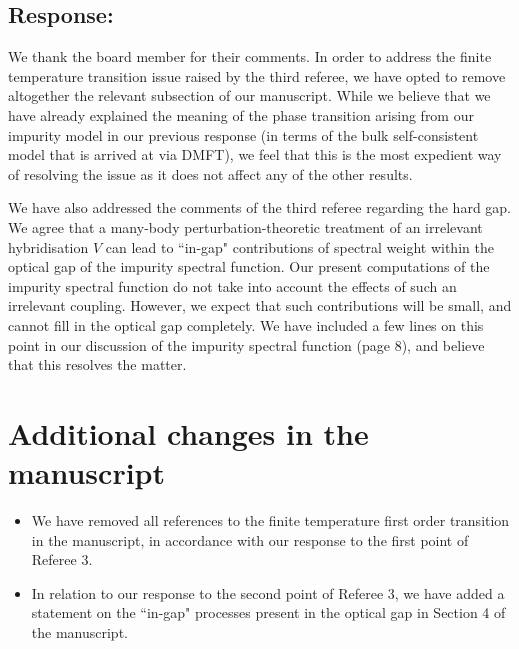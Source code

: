 \documentclass{article}
\newcommand{\response}[1]{{\color{blue}\subsection*{Response:}{#1}\vspace*{10pt}}}
\begin{document}
\response{
	We thank the board member for their comments. In order to address the finite temperature transition issue raised by the third referee, we have opted to remove altogether the relevant subsection of our manuscript. While we believe that we have already explained the meaning of the phase transition arising from our impurity model in our previous response (in terms of the bulk self-consistent model that is arrived at via DMFT), we feel that this is the most expedient way of resolving the issue as it does not affect any of the other results.
\par\noindent
We have also addressed the comments of the third referee regarding the hard gap. We agree that a many-body perturbation-theoretic treatment of an irrelevant hybridisation $V$ can lead to ``in-gap" contributions of spectral weight within the optical gap of the impurity spectral function. Our present computations of the impurity spectral function do not take into account the effects of such an irrelevant coupling. However, we expect that such contributions will be small, and cannot fill in the optical gap completely. We have included a few lines on this point in our discussion of the impurity spectral function (page 8), and believe that this resolves the matter. 
}

\section*{Additional changes in the manuscript}
\begin{itemize}
	\item We have removed all references to the finite temperature first order transition in the manuscript, in accordance with our response to the first point of Referee 3.
	\item In relation to our response to the second point of Referee 3, we have added a statement on the ``in-gap" processes present in the optical gap in Section 4 of the manuscript.
\end{itemize}



\end{document}
